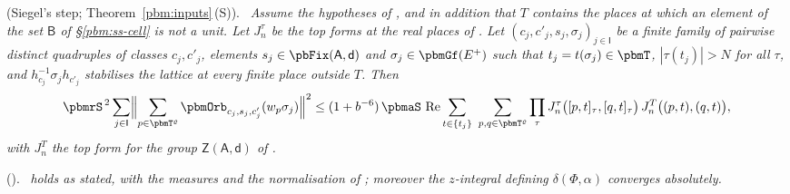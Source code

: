 \documentclass[10pt]{amsart}
\theoremstyle{definition}
\theoremstyle{remark}
\newcommand{\Rel}{\operatorname{Re}}
\providecommand{\pffZ}{\mathsf Z}
\newenvironment{quotedthm}[2]{\par\medskip\noindent\begingroup
  \textbf{#1}#2.\ \itshape\ignorespaces}{\endgroup\par\medskip}
\begin{document}
\begin{quotedthm}{\cite[Theorem~5.29]{P52}}{ (Siegel's step; Theorem~\ref{pbm:inputs}\,\textup{(S)})}
Assume the hypotheses of {\cite[Theorem~5.28]{P52}}, and in addition that $T$ contains the places at which
an element of the set $\mathsf B$ of \S\ref{pbm:ss-cell} is not a unit. Let $J^\tau_n$ be the top
forms at the real places of {\cite[Theorem~2.17]{P52}}. Let $(c_j,c'_j,s_j,\sigma_j)_{j\in\mathsf I}$ be a
finite family of pairwise distinct quadruples of classes $c_j,c'_j$, elements $s_j\in\pbFix(\mathsf
A,\mathsf d)$ and $\sigma_j\in\pbmGf(E^+)$ such that $t_j=t(\sigma_j)\in\pbmT$, $|\tau(t_j)|>N$
for all $\tau$, and $h_{c_j}^{-1}\sigma_jh_{c'_j}$ stabilises the lattice at every finite place
outside $T$. Then
\[
\pbmrS^{\,2}\sum_{j\in\mathsf I}\Bigl\|\sum_{p\in\pbmT^\varrho}\pbmOrb_{c_j,s_j,c'_j}(w_p\sigma_j)
\Bigr\|^2\le(1+b^{-6})\,\pbmaS\,\Rel\sum_{t\in\{t_j\}}\ \sum_{p,q\in\pbmT^\varrho}\prod_\tau J^\tau_n
\bigl([p,t]_\tau,[q,t]_\tau\bigr)\,J^T_n\bigl((p,t),(q,t)\bigr),
\]
with $J^T_n$ the top form {\cite[(12)]{P52}} for the group $\pffZ(\mathsf A,\mathsf d)$ of
{\cite[Theorem~5.28]{P52}}.
\end{quotedthm}

\begin{quotedthm}{\cite[Proposition~6.35]{P52}}{ ({\cite[Theorem~5.31]{P52}})}
{\cite[Theorem~5.31]{P52}} holds as stated, with the measures and the normalisation of {\cite[\S5.7]{P52}}; moreover
the $z$-integral defining $\delta(\Phi,\alpha)$ converges absolutely.
\end{quotedthm}
\end{document}
